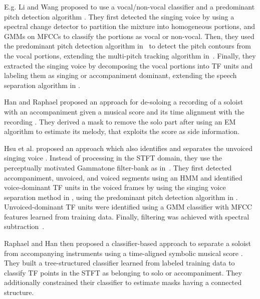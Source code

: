 
E.g. Li and Wang proposed to use a vocal/non-vocal classifier and a predominant pitch detection algorithm \cite{li06, li07}. They first detected the singing voice by using a spectral change detector \cite{duxbury03} to partition the mixture into homogeneous portions, and GMMs on MFCCs to classify the portions as vocal or non-vocal. Then, they used the predominant pitch detection algorithm in~\cite{li05} to detect the pitch contours from the vocal portions, extending the multi-pitch tracking algorithm in~\cite{wu03}. Finally, they extracted the singing voice by decomposing the vocal portions into TF units and labeling them as singing or accompaniment dominant, extending the speech separation algorithm in \cite{hu02}.
\par
Han and Raphael proposed an approach for de-soloing a recording of a soloist with an accompaniment given a musical score and its time alignment with the recording \cite{han07}. They derived a mask \cite{roweis01} to remove the solo part after using an EM algorithm to estimate its melody, that exploits the score as side information.
\par
Hsu et al. proposed an approach which also identifies and separates the unvoiced singing voice \cite{hsu08,hsu10}. Instead of processing in the STFT domain, they use the perceptually motivated Gammatone filter-bank as in~\cite{hu02,li07}. They first detected accompaniment, unvoiced, and voiced segments using an HMM and identified voice-dominant TF units in the voiced frames by using the singing voice separation method in \cite{li07}, using the predominant pitch detection algorithm in \cite{dressler062}. Unvoiced-dominant TF units were identified using a GMM classifier with MFCC features learned from training data. Finally, filtering was achieved with spectral subtraction~\cite{scalart96}.
\par
Raphael and Han then proposed a classifier-based approach to separate a soloist from accompanying instruments using a time-aligned symbolic musical score \cite{raphael08}. They built a tree-structured classifier \cite{breiman84} learned from labeled training data to classify TF points in the STFT as belonging to solo or accompaniment. They additionally constrained their classifier to estimate masks having a connected structure.
\par
